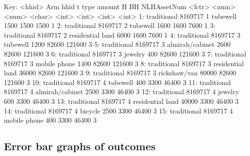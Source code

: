 \begin{Schunk}
\begin{Soutput}
Key: <hhid>
            Arm    hhid     t             type amount     H     BH NLHAssetNum
         <fctr>   <num> <num>           <char>  <int> <int>  <int>       <int>
 1: traditional 8169717     1         tubewell   1500  1500   1500           1
 2: traditional 8169717     2         tubewell   1600  1600   7600           1
 3: traditional 8169717     2 residential land   6000  1600   7600           1
 4: traditional 8169717     3         tubewell   1200 82600 121600           3
 5: traditional 8169717     3  almirah/cabinet   2600 82600 121600           3
 6: traditional 8169717     3          jewelry    400 82600 121600           3
 7: traditional 8169717     3     mobile phone   1400 82600 121600           3
 8: traditional 8169717     3 residential land  36000 82600 121600           3
 9: traditional 8169717     3     rickshaw/van  80000 82600 121600           3
10: traditional 8169717     4         tubewell    400  3300  46400           3
11: traditional 8169717     4  almirah/cabinet   2500  3300  46400           3
12: traditional 8169717     4          jewelry    600  3300  46400           3
13: traditional 8169717     4 residential land  40000  3300  46400           3
14: traditional 8169717     4          bicycle   2500  3300  46400           3
15: traditional 8169717     4     mobile phone    400  3300  46400           3
\end{Soutput}
\end{Schunk}


\subsection{Error bar graphs of outcomes}







